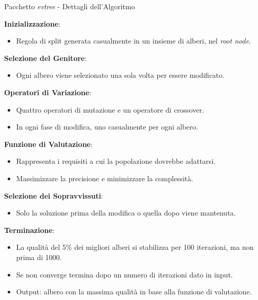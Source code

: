 \documentclass[9pt, xcolor=table]{beamer}
\begin{document}
	\begin{frame}{Pacchetto \textit{evtree} - Dettagli dell'Algoritmo}

		\textbf{Inizializzazione}:
		\begin{itemize}
			\item Regola di split generata casualmente in un insieme di alberi, nel \textit{root node}.
		\end{itemize}
		\textbf{Selezione del Genitore}:
		\begin{itemize}
			\item Ogni albero viene selezionato una sola volta per essere modificato.
		\end{itemize}
		\textbf{Operatori di Variazione}:
		\begin{itemize}
			\item Quattro operatori di mutazione e un operatore di crossover.
			\item In ogni fase di modifica, uno casualmente per ogni albero.
		\end{itemize}
		\textbf{Funzione di Valutazione}:
		\begin{itemize}
			\item Rappresenta i requisiti a cui la popolazione dovrebbe adattarsi. 
			\item Massimizzare la precisione e minimizzare la complessità.
		\end{itemize}
		\textbf{Selezione dei Sopravvissuti}:
		\begin{itemize}
			\item Solo la soluzione prima della modifica o quella dopo viene mantenuta. 
		\end{itemize}
		\textbf{Terminazione}:
		\begin{itemize}
			\item La qualità del 5\% dei migliori alberi si stabilizza per 100 iterazioni, ma non prima di 1000.
			\item Se non converge termina dopo un numero di iterazioni dato in input.
			\item Output: albero con la massima qualità in base alla funzione di valutazione.
		\end{itemize}	
	\end{frame}
\end{document}
